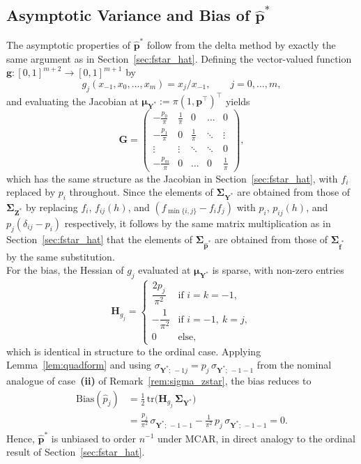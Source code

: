 ﻿\documentclass[12pt,a4paper]{scrreprt}
\theoremstyle{definition}
\begin{document}
\begin{appendices}
\section{Asymptotic Variance and Bias of $\hat{\boldsymbol{p}}^*$}
\label{app:pstar}

The asymptotic properties of $\hat{\boldsymbol{p}}^*$ follow from the
delta method by exactly the same argument as in
Section~\ref{sec:fstar_hat}. Defining the vector-valued function
$\boldsymbol{g}\colon [0,1]^{m+2} \to [0,1]^{m+1}$ by
\[
    g_j(x_{-1}, x_0, \ldots, x_m) = x_j / x_{-1},
    \qquad j = 0, \ldots, m,
\]
and evaluating the Jacobian at
$\boldsymbol{\mu}_{\boldsymbol{Y}^*} := \pi(1, \boldsymbol{p}^\top)^\top$
yields
\[
    \boldsymbol{G} =
    \begin{pmatrix}
        -\frac{p_0}{\pi} & \frac{1}{\pi} & 0 & \ldots & 0\\
        -\frac{p_1}{\pi} & 0 & \frac{1}{\pi} & \ddots & \vdots \\
        \vdots & \vdots & \ddots & \ddots & 0\\
        -\frac{p_{m}}{\pi} & 0 & \ldots & 0 & \frac{1}{\pi}
    \end{pmatrix},
\]
which has the same structure as the Jacobian in
Section~\ref{sec:fstar_hat}, with $f_i$ replaced by $p_i$ throughout.
Since the elements of $\boldsymbol{\Sigma}_{\boldsymbol{Y}^*}$ are
obtained from those of $\boldsymbol{\Sigma}_{\boldsymbol{Z}^*}$ by
replacing $f_i$, $f_{ij}(h)$, and $(f_{\min\{i,j\}} - f_if_j)$ with
$p_i$, $p_{ij}(h)$, and $p_j(\delta_{ij} - p_i)$ respectively, it
follows by the same matrix multiplication as in
Section~\ref{sec:fstar_hat} that the elements of
$\boldsymbol{\Sigma}_{\hat{\boldsymbol{p}}^*}$ are obtained from those
of $\boldsymbol{\Sigma}_{\hat{\boldsymbol{f}}^*}$ by the same
substitution.\\
For the bias, the Hessian of $g_j$ evaluated at
$\boldsymbol{\mu}_{\boldsymbol{Y}^*}$ is sparse, with non-zero entries
\[
    \boldsymbol{H}_{g_j} =
    \begin{cases}
        \dfrac{2p_j}{\pi^2}  & \text{if } i = k = -1, \\[1ex]
        -\dfrac{1}{\pi^2}    & \text{if } i = -1,\ k = j, \\[1ex]
        0                    & \text{else,}
    \end{cases}
\]
which is identical in structure to the ordinal case. Applying
Lemma~\ref{lem:quadform} and using
$\sigma_{\boldsymbol{Y}^*;\,-1 j} = p_j\,\sigma_{\boldsymbol{Y}^*;\,-1-1}$
from the nominal analogue of case~\textbf{(ii)} of
Remark~\ref{rem:sigma_zstar}, the bias reduces to
\begin{align*}
    \mathrm{Bias}(\hat{p}_j)
    &= \frac{1}{2}\,\mathrm{tr}
       \bigl(\boldsymbol{H}_{g_j}\,\boldsymbol{\Sigma}_{\boldsymbol{Y}^*}\bigr) \\
    &= \frac{p_j}{\pi^2}\,\sigma_{\boldsymbol{Y}^*;\,-1-1}
       - \frac{1}{\pi^2}\,p_j\,\sigma_{\boldsymbol{Y}^*;\,-1-1}
     = 0.
\end{align*}
Hence, $\hat{\boldsymbol{p}}^*$ is unbiased to order $n^{-1}$ under
MCAR, in direct analogy to the ordinal result of
Section~\ref{sec:fstar_hat}.

\end{appendices}
\end{document}
